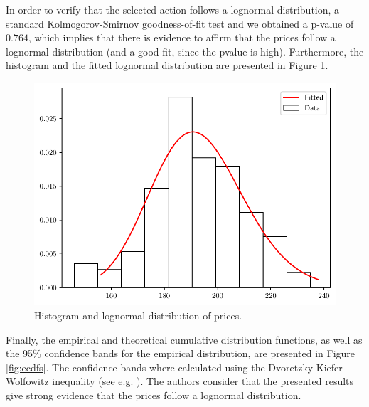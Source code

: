\documentclass[11pt]{article}
\theoremstyle{definition}
\theoremstyle{remark}
\theoremstyle{remark}
\begin{document}
In order to verify that the selected action follows a lognormal distribution, a
standard Kolmogorov-Smirnov goodness-of-fit test and we obtained a p-value of
$0.764$, which implies that there is evidence to affirm that the prices follow a
lognormal distribution (and a good fit, since the pvalue is high). Furthermore,
the histogram and the fitted lognormal distribution are presented in Figure
\ref{fig:hist_log_prices}.

\begin{figure}[H]
    \centering
    \includegraphics[scale=0.5]{../plts/price_fitting.pdf}
    \caption{Histogram and lognormal distribution of prices.}
    \label{fig:hist_log_prices}
\end{figure}

Finally, the empirical and theoretical cumulative distribution functions, as
well as the 95\% confidence bands for the empirical distribution, are presented
in Figure \ref{fig:ecdfs}. The confidence bands where calculated using the
Dvoretzky-Kiefer-Wolfowitz inequality (see e.g. \parencite{wasserman2006}). The
authors consider that the presented results give strong evidence that the prices
follow a lognormal distribution.
\end{document}
